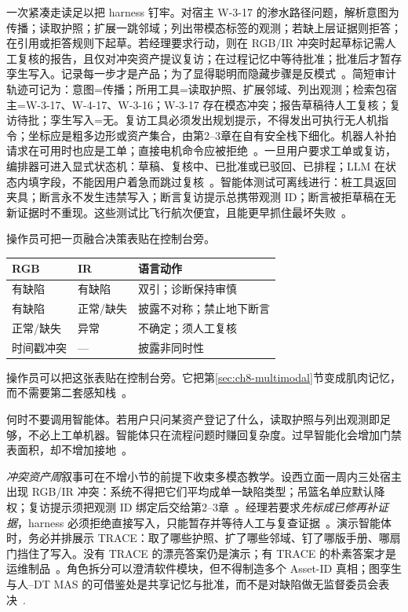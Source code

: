 一次紧凑走读足以把 harness 钉牢。对宿主 W-3-17 的渗水路径问题，解析意图为传播；读取护照；扩展一跳邻域；列出带模态标签的观测；若缺上层证据则拒答；在引用或拒答规则下起草。若经理要求行动，则在 RGB/IR 冲突时起草标记需人工复核的报告，且仅对冲突资产提议复访；在过程记忆中等待批准；批准后才暂存孪生写入。记录每一步才是产品；为了显得聪明而隐藏步骤是反模式~\cite{yao2023react,wang2024surveyagents,luo2025llmdtrobot,gao2026ifcagent,lu2026highwaymas}。简短审计轨迹可记为：意图=传播；所用工具=读取护照、扩展邻域、列出观测；检索包宿主=W-3-17、W-4-17、W-3-16；W-3-17 存在模态冲突；报告草稿待人工复核；复访待批；孪生写入=无。复访工具必须发出规划提示，不得发出可执行无人机指令；坐标应是粗多边形或资产集合，由第2--3章在自有安全栈下细化。机器人补拍请求在可用时也应是工单；直接电机命令应被拒绝~\cite{luo2025llmdtrobot}。一旦用户要求工单或复访，编排器可进入显式状态机：草稿、复核中、已批准或已驳回、已排程；LLM 在状态内填字段，不能因用户着急而跳过复核~\cite{gao2026ifcagent,zhang2025llmagentschema,rawat2025llmmas,lu2026highwaymas}。智能体测试可离线进行：桩工具返回夹具；断言永不发生违禁写入；断言复访提示总携带观测 ID；断言被拒草稿在无新证据时不重现。这些测试比飞行航次便宜，且能更早抓住最坏失败~\cite{wang2024surveyagents,li2024surveymultiagent,ma2026tenquestions}。



操作员可把一页融合决策表贴在控制台旁。
\begin{center}
\begin{tabular}{llp{5.2cm}}
\hline
RGB & IR & 语言动作 \\
\hline
有缺陷 & 有缺陷 & 双引；诊断保持审慎 \\
有缺陷 & 正常/缺失 & 披露不对称；禁止地下断言 \\
正常/缺失 & 异常 & 不确定；须人工复核 \\
时间戳冲突 & --- & 披露非同时性 \\
\hline
\end{tabular}
\end{center}
\vspace{0.5em}
操作员可以把这张表贴在控制台旁。它把第\ref{sec:ch8-multimodal}节变成肌肉记忆，而不需要第二套感知栈~\cite{zhao2024facade,zhao2026physical}。

何时不要调用智能体。若用户只问某资产登记了什么，读取护照与列出观测即足够，不必上工单机器。智能体只在流程问题时赚回复杂度。过早智能化会增加门禁表面积，却不增加接地~\cite{yao2023react,wang2024surveyagents}。

\emph{冲突资产周}叙事可在不增小节的前提下收束多模态教学。设西立面一周内三处宿主出现 RGB/IR 冲突：系统不得把它们平均成单一缺陷类型；吊篮名单应默认降权；复访提示须把观测 ID 绑定后交给第2--3章~\cite{zhao2024facade,zhao2026physical,luo2025llmdtrobot}。经理若要求\emph{先标成已修再补证据}，harness 必须拒绝直接写入，只能暂存并等待人工与复查证据~\cite{gao2026ifcagent,lu2026highwaymas}。演示智能体时，务必并排展示 TRACE：取了哪些护照、扩了哪些邻域、钉了哪版手册、哪扇门挡住了写入。没有 TRACE 的漂亮答案仍是演示；有 TRACE 的朴素答案才是运维制品~\cite{wang2024surveyagents,liang2023helm,hellin2025bimmas}。角色拆分可以澄清软件模块，但不得制造多个 Asset-ID 真相；图孪生与人--DT MAS 的可借鉴处是共享记忆与批准，而不是对缺陷做无监督委员会表决~\cite{pan2026graphdtgpt,lu2026highwaymas,rawat2025llmmas,koh2026bimllmretr}.



